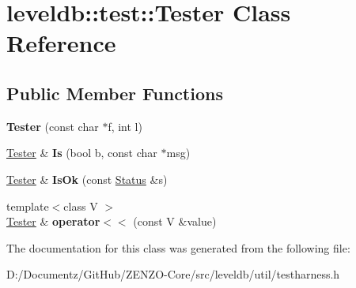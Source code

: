 \hypertarget{classleveldb_1_1test_1_1_tester}{}\section{leveldb\+::test\+::Tester Class Reference}
\label{classleveldb_1_1test_1_1_tester}
\subsection*{Public Member Functions}
\begin{DoxyCompactItemize}
\item 
\mbox{\label{classleveldb_1_1test_1_1_tester_a166bc7b18483780292a44425ef5e64f7}} 
{\bfseries Tester} (const char $\ast$f, int l)
\item 
\mbox{\label{classleveldb_1_1test_1_1_tester_ad75cd5ea132083b72e7fd7271ef1918a}} 
\mbox{\hyperlink{classleveldb_1_1test_1_1_tester}{Tester}} \& {\bfseries Is} (bool b, const char $\ast$msg)
\item 
\mbox{\label{classleveldb_1_1test_1_1_tester_af0e4decc6f483a78af44926634d990c2}} 
\mbox{\hyperlink{classleveldb_1_1test_1_1_tester}{Tester}} \& {\bfseries Is\+Ok} (const \mbox{\hyperlink{classleveldb_1_1_status}{Status}} \&s)
\item 
\mbox{\label{classleveldb_1_1test_1_1_tester_a4e776d487df19ac9daeed5527cd1d80e}} 
{\footnotesize template$<$class V $>$ }\\\mbox{\hyperlink{classleveldb_1_1test_1_1_tester}{Tester}} \& {\bfseries operator$<$$<$} (const V \&value)
\end{DoxyCompactItemize}


The documentation for this class was generated from the following file\+:\begin{DoxyCompactItemize}
\item 
D\+:/\+Documentz/\+Git\+Hub/\+Z\+E\+N\+Z\+O-\/\+Core/src/leveldb/util/testharness.\+h\end{DoxyCompactItemize}
